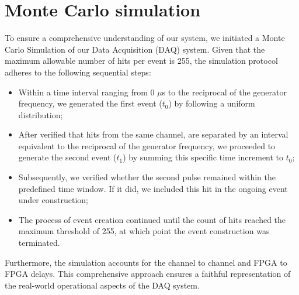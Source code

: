 \section{Monte Carlo simulation}\label{MonteCarlo}
To ensure a comprehensive understanding of our system, we initiated a Monte Carlo Simulation of our Data Acquisition (DAQ) system. 
Given that the maximum allowable number of hits per event is 255, the simulation protocol adheres to the following sequential steps:
\begin{itemize}
  \item Within a time interval ranging from 0 $\mu$s to the reciprocal of the generator frequency, we generated the first event ($t_0$) by following a uniform distribution;
    \item After verified that hits from the same channel, are separated by an interval equivalent to the reciprocal of the generator frequency, we proceeded to 
      generate the second event ($t_1$) by summing this specific time increment to $t_0$;
      \item Subsequently, we verified whether the second pulse remained within the predefined time window. If it did, we included this hit in the ongoing event under construction;
      \item The process of event creation continued until the count of hits reached the maximum threshold of 255, at which point the event construction was terminated.
\end{itemize}
Furthermore, the simulation accounts for the channel to channel and FPGA to FPGA delays. 
This comprehensive approach ensures a faithful representation of the real-world operational aspects of the DAQ system.


